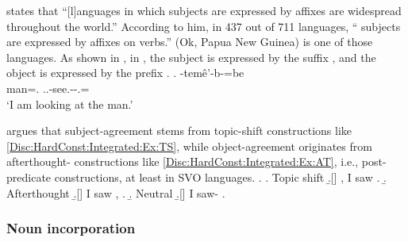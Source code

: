  states that
``[l]anguages in which  subjects are expressed by  affixes are widespread throughout the world.''
According to him,
in 437 out of 711 languages,
`` subjects are expressed by affixes on verbs.''
 (Ok, Papua New Guinea) is one of those languages.
As shown in \Next, in ,
the subject is expressed by the suffix , and
the object is expressed by the prefix .
%
\exg.
   -tem\^{e}'-b-=be \\
  man=. ..-see.--.= \\
 `I am looking at the man.'
 \hfill{\cite[261]{fedden07}}


 argues that
subject-agreement stems from topic-shift constructions like \ref{Disc:HardConst:Integrated:Ex:TS},
while object-agreement originates from afterthought- constructions like \ref{Disc:HardConst:Integrated:Ex:AT},
i.e., post-predicate constructions,
at least in SVO languages.
%
\ex.\label{Disc:HardConst:Integrated:Ex:AT}
 \a. Topic shift
 \b.[] , I saw .
 \b. Afterthought
 \b.[] I saw , .
 \b. Neutral
 \b.[] I saw- .




\subsubsection{Noun incorporation}

